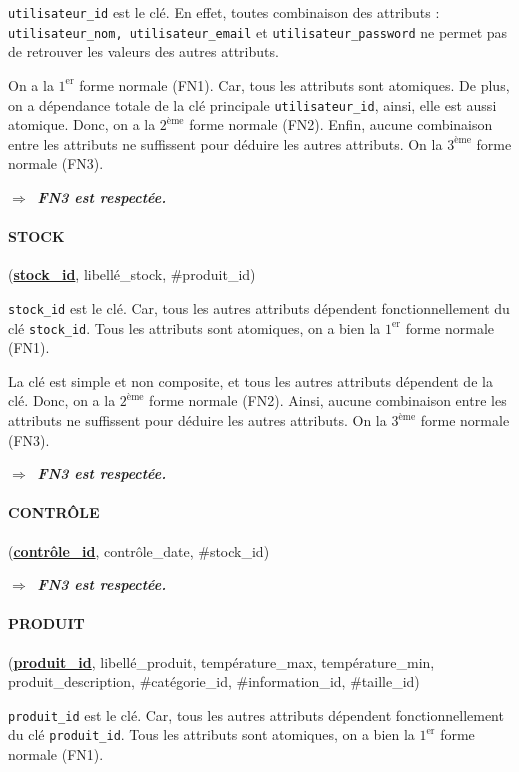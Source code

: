 \texttt{utilisateur\_id} est le clé. En effet, toutes combinaison des attributs : \texttt{utilisateur\_nom, utilisateur\_email} et \texttt{utilisateur\_password} ne permet pas de retrouver les valeurs des autres attributs.

On a la $1^{\text{er}}$ forme normale (FN1). Car, tous les attributs sont atomiques. De plus, on a dépendance totale de la clé principale \texttt{utilisateur\_id}, ainsi, elle est aussi atomique. Donc, on a la $2^{\text{ème}}$ forme normale (FN2). Enfin, aucune combinaison entre les attributs ne suffissent pour déduire les autres attributs. On la $3^{\text{ème}}$ forme normale (FN3).

$\Longrightarrow\:$ \textbf{\textit{FN3 est respectée.}}

\paragraph{STOCK} (\textbf{\underline{stock\_id}}, libellé\_stock, \#produit\_id)

\texttt{stock\_id} est le clé. Car, tous les autres attributs dépendent fonctionnellement du clé \texttt{stock\_id}. Tous les attributs sont atomiques, on a bien la $1^{\text{er}}$ forme normale (FN1).

La clé est simple et non composite, et tous les autres attributs dépendent de la clé. Donc, on a la $2^{\text{ème}}$ forme normale (FN2). Ainsi, aucune combinaison entre les attributs ne suffissent pour déduire les autres attributs. On la $3^{\text{ème}}$ forme normale (FN3).

$\Longrightarrow\:$ \textbf{\textit{FN3 est respectée.}}

\paragraph{CONTRÔLE} (\textbf{\underline{contrôle\_id}}, contrôle\_date, \#stock\_id)

$\Longrightarrow\:$ \textbf{\textit{FN3 est respectée.}}

\paragraph{PRODUIT} (\textbf{\underline{produit\_id}}, libellé\_produit, température\_max, température\_min, produit\_description, \#catégorie\_id, \#information\_id, \#taille\_id)

\texttt{produit\_id} est le clé. Car, tous les autres attributs dépendent fonctionnellement du clé \texttt{produit\_id}. Tous les attributs sont atomiques, on a bien la $1^{\text{er}}$ forme normale (FN1).


